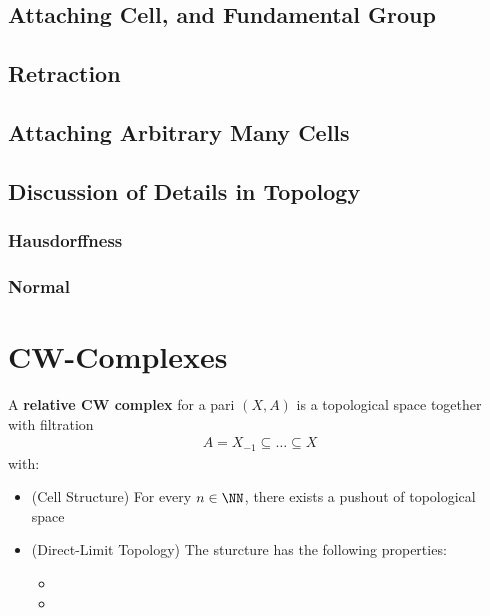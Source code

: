 \documentclass[Total.tex]{subfiles}
\begin{document}
			\subsection{Attaching Cell, and Fundamental Group}
			\subsection{Retraction}
			\subsection{Attaching Arbitrary Many Cells}
			\subsection{Discussion of Details in Topology}
				\subsubsection{Hausdorffness}
				\subsubsection{Normal}
		\section{CW-Complexes}
			
			\begin{Def}
				A \textbf{relative CW complex} for a pari $(X,A)$ is a topological space together with filtration
				\begin{gather*}
					A=X_{-1}\subseteq \dots\subseteq X
				\end{gather*}
				with:
				\begin{itemize}
					\item (Cell Structure) For every $n\in \NN$, there exists a pushout of topological space
					\begin{center}
					\end{center}
					\item (Direct-Limit Topology) The sturcture has the following properties:
					\begin{itemize}
						\item 
						\item 
					\end{itemize}
				\end{itemize}
			\end{Def}
			
\end{document}
